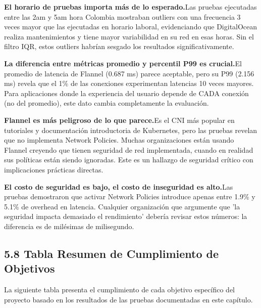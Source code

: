 \documentclass[journal]{IEEEtran}
\begin{document}
\textbf{El horario de pruebas importa más de lo esperado.}Las pruebas ejecutadas entre las 2am y 5am hora Colombia mostraban outliers con una frecuencia 3 veces mayor que las ejecutadas en horario laboral, evidenciando que DigitalOcean realiza mantenimientos y tiene mayor variabilidad en su red en esas horas. Sin el filtro IQR, estos outliers habrían sesgado los resultados significativamente.

\textbf{La diferencia entre métricas promedio y percentil P99 es crucial.}El promedio de latencia de Flannel (0.687 ms) parece aceptable, pero su P99 (2.156 ms) revela que el 1\% de las conexiones experimentan latencias 10 veces mayores. Para aplicaciones donde la experiencia del usuario depende de CADA conexión (no del promedio), este dato cambia completamente la evaluación.

\textbf{Flannel es más peligroso de lo que parece.}Es el CNI más popular en tutoriales y documentación introductoria de Kubernetes, pero las pruebas revelan que no implementa Network Policies. Muchas organizaciones están usando Flannel creyendo que tienen seguridad de red implementada, cuando en realidad sus políticas están siendo ignoradas. Este es un hallazgo de seguridad crítico con implicaciones prácticas directas.

\textbf{El costo de seguridad es bajo, el costo de inseguridad es alto.}Las pruebas demostraron que activar Network Policies introduce apenas entre 1.9\% y 5.1\% de overhead en latencia. Cualquier organización que argumente que 'la seguridad impacta demasiado el rendimiento' debería revisar estos números: la diferencia es de milésimas de milisegundo.

\subsection{5.8 Tabla Resumen de Cumplimiento de Objetivos}

La siguiente tabla presenta el cumplimiento de cada objetivo específico del proyecto basado en los resultados de las pruebas documentadas en este capítulo.
\end{document}
